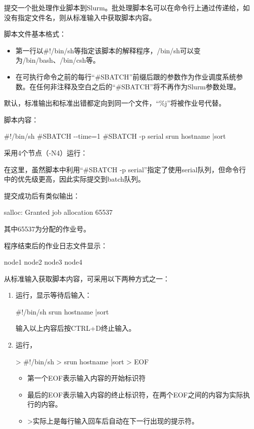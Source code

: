 提交一个批处理作业脚本到Slurm。批处理脚本名可以在命令行上通过传递给，如没有指定文件名，则从标准输入中获取脚本内容。

脚本文件基本格式：
\begin{itemize}
	\item 第一行以\#!/bin/sh等指定该脚本的解释程序，/bin/sh可以变为/bin/bash、/bin/csh等。
	\item 在可执行命令之前的每行``\#SBATCH''前缀后跟的参数作为作业调度系统参数。在任何非注释及空白之后的``\#SBATCH''将不再作为Slurm参数处理。

\end{itemize}

默认，标准输出和标准出错都定向到同一个文件，``\%j''将被作业号代替。

脚本内容：
\begin{SH}
#!/bin/sh
#SBATCH -{}-time=1
#SBATCH -p serial
srun hostname |sort
\end{SH}

采用4个节点（-N4）运行：

在这里，虽然脚本中利用``\#SBATCH -p serial''指定了使用serial队列，但命令行中的优先级更高，因此实际提交到batch队列。

提交成功后有类似输出：
\begin{OUT}
salloc: Granted job allocation 65537
\end{OUT}
其中65537为分配的作业号。

程序结束后的作业日志文件显示：
\begin{OUT}
node1
node2
node3
node4
\end{OUT}

从标准输入获取脚本内容，可采用以下两种方式之一：
\begin{enumerate}
	\item 运行，显示等待后输入：
\begin{SH}
#!/bin/sh
srun hostname |sort
\end{SH}
输入以上内容后按CTRL+D终止输入。
	\item 运行，
	\begin{SH}
> #!/bin/sh
> srun hostname |sort
> EOF
\end{SH}
\begin{itemize}
	\item 第一个EOF表示输入内容的开始标识符
	\item 最后的EOF表示输入内容的终止标识符，在两个EOF之间的内容为实际执行的内容。
	\item >实际上是每行输入回车后自动在下一行出现的提示符。
\end{itemize}
\end{enumerate}

